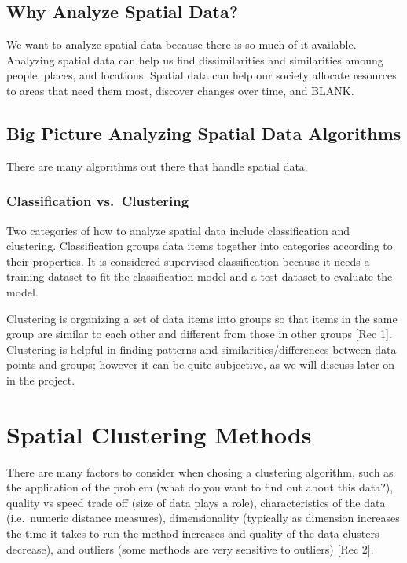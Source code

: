 \documentclass[12pt,twoside]{amherstthesis}
\begin{document}
  \section{Why Analyze Spatial Data?}\label{why-analyze-spatial-data}
  
  We want to analyze spatial data because there is so much of it
  available. Analyzing spatial data can help us find dissimilarities and
  similarities amoung people, places, and locations. Spatial data can help
  our society allocate resources to areas that need them most, discover
  changes over time, and BLANK.
  
  \section{Big Picture Analyzing Spatial Data
  Algorithms}\label{big-picture-analyzing-spatial-data-algorithms}
  
  There are many algorithms out there that handle spatial data.
  
  \subsection{Classification
  vs.~Clustering}\label{classification-vs.clustering}
  
  Two categories of how to analyze spatial data include classification and
  clustering. Classification groups data items together into categories
  according to their properties. It is considered supervised
  classification because it needs a training dataset to fit the
  classification model and a test dataset to evaluate the model.
  
  Clustering is organizing a set of data items into groups so that items
  in the same group are similar to each other and different from those in
  other groups {[}Rec 1{]}. Clustering is helpful in finding patterns and
  similarities/differences between data points and groups; however it can
  be quite subjective, as we will discuss later on in the project.
  
  \chapter{Spatial Clustering Methods}\label{rmd-basics}
  
  There are many factors to consider when chosing a clustering algorithm,
  such as the application of the problem (what do you want to find out
  about this data?), quality vs speed trade off (size of data plays a
  role), characteristics of the data (i.e.~numeric distance measures),
  dimensionality (typically as dimension increases the time it takes to
  run the method increases and quality of the data clusters decrease), and
  outliers (some methods are very sensitive to outliers) {[}Rec 2{]}.
  
\end{document}
